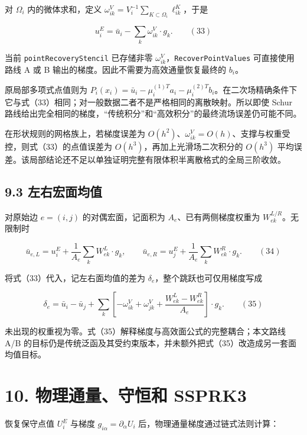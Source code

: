 \documentclass[
  11pt,
  a4paper,
]{article}
\begin{document}
对 \(\Omega_i\) 内的微体求和，定义
\(\omega^V_{ik}=V_i^{-1}\sum_{K\subset\Omega_i}\ell_{ik}^K\)，于是

\[
u_i^E=\bar u_i-\sum_k\omega^V_{ik}\cdot g_k. \qquad(33)
\]

当前 \texttt{pointRecoveryStencil} 已存储非零
\(\omega^V_{ik}\)，\texttt{RecoverPointValues} 可直接使用路线 A 或 B
输出的梯度。因此不需要为高效通量恢复最终的 \(b_i\)。

原局部多项式点值则为
\(P_i(x_i)=\bar u_i-\mu_i^{(1)T}a_i-\mu_i^{(2)T}b_i\)。在二次场精确条件下它与式（33）相同；对一般数据二者不是严格相同的离散映射。所以即使
Schur
路线给出完全相同的梯度，``传统积分''和``高效积分''的最终流场误差仍可能不同。

在形状规则的网格族上，若梯度误差为
\(O(h^2)\)、\(\omega^V_{ik}=O(h)\)、支撑与权重受控，则式（33）的点值误差为
\(O(h^3)\)，再加上光滑场二次积分的 \(O(h^3)\)
平均误差。该局部结论还不足以单独证明完整有限体积半离散格式的全局三阶收敛。

\hypertarget{ux5de6ux53f3ux5b8fux9762ux5747ux503c}{%
\subsection{9.3
左右宏面均值}\label{ux5de6ux53f3ux5b8fux9762ux5747ux503c}}

对原始边 \(e=(i,j)\) 的对偶宏面，记面积为 \(A_e\)、已有两侧梯度权重为
\(W_{ek}^{L/R}\)。无限制时

\[
\bar u_{e,L}=u_i^E+\frac1{A_e}\sum_kW_{ek}^L\cdot g_k,
\qquad
\bar u_{e,R}=u_j^E+\frac1{A_e}\sum_kW_{ek}^R\cdot g_k. \qquad(34)
\]

将式（33）代入，记左右面均值的差为
\(\delta_e\)，整个跳跃也可仅用梯度写成

\[
\delta_e=\bar u_i-\bar u_j
+\sum_k\left[-\omega^V_{ik}+\omega^V_{jk}
+\frac{W_{ek}^{L}-W_{ek}^{R}}{A_e}\right]\cdot g_k. \qquad(35)
\]

未出现的权重视为零。式（35）解释梯度与高效面公式的完整耦合；本文路线 A/B
的目标仍是传统泛函及其受约束版本，并未额外把式（35）改造成另一套面均值目标。

\hypertarget{ux7269ux7406ux901aux91cfux5b88ux6052ux548c-ssprk3}{%
\section{10. 物理通量、守恒和
SSPRK3}\label{ux7269ux7406ux901aux91cfux5b88ux6052ux548c-ssprk3}}

恢复保守点值 \(U_i^E\) 与梯度 \(g_{i\alpha}=\partial_\alpha U_i\)
后，物理通量梯度通过链式法则计算：
\end{document}
